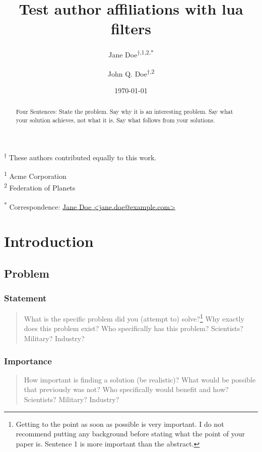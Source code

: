 \documentclass[
  10pt,
  draftcls,
  technote,
  letterpaper,
  oneside,
  onecolumn]{IEEEtran}
\title{Test author affiliations with lua filters}
\author{Jane Doe\textsuperscript{$\dagger{}$,1,2,*} \and John Q. Doe\textsuperscript{$\dagger{}$,2}}
\date{\today}
\begin{document}
\maketitle
\begin{abstract}
Four Sentences: State the problem. Say why it is an interesting problem.
Say what your solution achieves, not what it is. Say what follows from
your solutions.
\end{abstract}

\textsuperscript{$\dagger{}$}
These authors contributed equally to this work.

\textsuperscript{1} Acme Corporation\\
\textsuperscript{2} Federation of Planets

\textsuperscript{*} Correspondence:
\href{mailto:jane.doe@example.com}{Jane Doe
\textless{}jane.doe@example.com\textgreater{}}

\hypertarget{introduction}{%
\section{Introduction}\label{introduction}}

\hypertarget{problem}{%
\subsection{Problem}\label{problem}}

\hypertarget{statement}{%
\subsubsection{Statement}\label{statement}}

\begin{quote}
What is the specific problem did you (attempt to) solve?\footnote{Getting
  to the point as soon as possible is very important. I do not recommend
  putting any background before stating what the point of your paper is.
  Sentence 1 is more important than the abstract.} Why exactly does this
problem exist? Who specifically has this problem? Scientists? Military?
Industry?
\end{quote}

\hypertarget{importance}{%
\subsubsection{Importance}\label{importance}}

\begin{quote}
How important is finding a solution (be realistic)? What would be
possible that previously was not? Who specifically would benefit and
how? Scientists? Military? Industry?
\end{quote}
\end{document}
